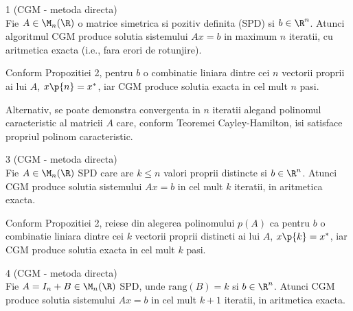 \begin{propozitie}{1 (CGM - metoda directa)}
    \text{ }\\[0.5em]
    Fie $A \in \M_n(\R)$ o matrice simetrica si pozitiv definita (SPD) si $b \in \R^n$. 
    Atunci algoritmul CGM produce solutia sistemului $Ax=b$ in maximum $n$ iteratii, cu aritmetica exacta (i.e., fara erori de rotunjire).
\end{propozitie}

\begin{demonstratie}
    Conform Propozitiei 2, pentru $ b $ o combinatie liniara dintre cei $ n $ vectorii proprii ai lui $ A $, $ x\p{n} = x^{*} $, iar CGM produce solutia exacta in cel mult $ n $ pasi.

    Alternativ, se poate demonstra convergenta in $ n $ iteratii alegand polinomul caracteristic al matricii $ A $ care, conform Teoremei Cayley-Hamilton, isi satisface propriul polinom caracteristic.
\end{demonstratie}

\begin{propozitie}{3 (CGM - metoda directa)}
    \text{ }\\[0.5em]
    Fie $A \in \M_n(\R)$ SPD care are $k \le n$ valori proprii distincte si $b \in \R^n$.
    Atunci CGM produce solutia sistemului $Ax=b$ in cel mult $k$ iteratii, in aritmetica exacta.
\end{propozitie}

\begin{demonstratie}
    Conform Propozitiei 2, reiese din alegerea polinomului $ p(A) $ ca pentru $ b $ o combinatie liniara dintre cei $ k $ vectorii proprii distincti ai lui $ A $, $ x\p{k} = x^{*} $, iar CGM produce solutia exacta in cel mult $ k $ pasi.
\end{demonstratie}

\begin{propozitie}{4 (CGM - metoda directa)}
    \text{ }\\[0.5em]
    Fie $A = I_n + B \in \M_n(\R)$ SPD, unde $\text{rang}(B) = k$ si $b \in \R^n$.
    Atunci CGM produce solutia sistemului $Ax=b$ in cel mult $k+1$ iteratii, in aritmetica exacta.
\end{propozitie}


